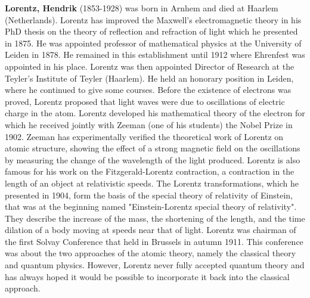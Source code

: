 \textbf{Lorentz, Hendrik} (1853-1928) was born in Arnhem and died at Haarlem (Netherlands). Lorentz has improved the Maxwell's electromagnetic theory in his PhD thesis on the theory of reflection and refraction of light which he presented in 1875. He was appointed professor of mathematical physics at the University of Leiden in 1878. He remained in this establishment until 1912 where Ehrenfest was appointed in his place. Lorentz was then appointed Director of Research at the Teyler's Institute of Teyler (Haarlem). He held an honorary position in Leiden, where he continued to give some courses. Before the existence of electrons was proved, Lorentz proposed that light waves were due to oscillations of electric charge in the atom. Lorentz developed his mathematical theory of the electron for which he received jointly with Zeeman (one of his students) the Nobel Prize in 1902.  Zeeman has experimentally verified the theoretical work of Lorentz on atomic structure, showing the effect of a strong magnetic field on the oscillations by measuring the change of the wavelength of the light produced. Lorentz is also famous for his work on the Fitzgerald-Lorentz contraction, a contraction in the length of an object at relativistic speeds. The Lorentz transformations, which he presented in 1904, form the basis of the special theory of relativity of Einstein, that was at the beginning named "Einstein-Lorentz special theory of relativity". They describe the increase of the mass, the shortening of the length, and the time dilation of a body moving at speeds near that of light. Lorentz was chairman of the first Solvay Conference that held in Brussels in autumn 1911. This conference was about the two approaches of the atomic theory, namely the classical theory and quantum physics. However, Lorentz never fully accepted quantum theory and has always hoped it would be possible to incorporate it back into the classical approach.

